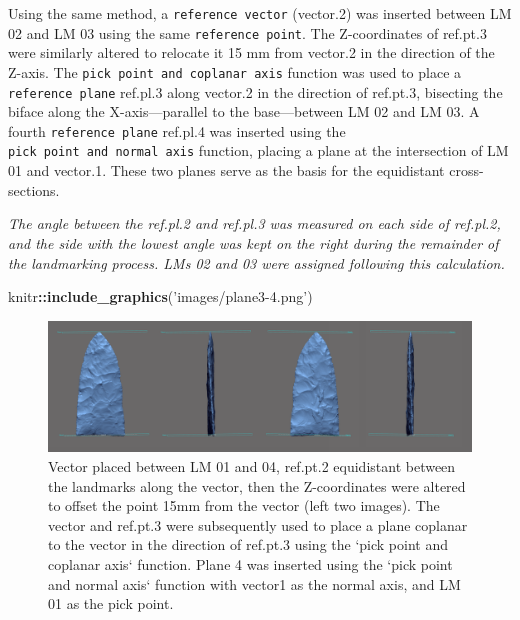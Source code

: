 \documentclass[
]{article}
\newenvironment{Shaded}{\begin{snugshade}}{\end{snugshade}}
\newcommand{\KeywordTok}[1]{\textcolor[rgb]{0.13,0.29,0.53}{\textbf{#1}}}
\newcommand{\NormalTok}[1]{#1}
\newcommand{\OperatorTok}[1]{\textcolor[rgb]{0.81,0.36,0.00}{\textbf{#1}}}
\newcommand{\StringTok}[1]{\textcolor[rgb]{0.31,0.60,0.02}{#1}}
\begin{document}
Using the same method, a \texttt{reference\ vector} (vector.2) was
inserted between LM 02 and LM 03 using the same
\texttt{reference\ point}. The Z-coordinates of ref.pt.3 were similarly
altered to relocate it 15 mm from vector.2 in the direction of the
Z-axis. The \texttt{pick\ point\ and\ coplanar\ axis} function was used
to place a \texttt{reference\ plane} ref.pl.3 along vector.2 in the
direction of ref.pt.3, bisecting the biface along the X-axis---parallel
to the base---between LM 02 and LM 03. A fourth
\texttt{reference\ plane} ref.pl.4 was inserted using the
\texttt{pick\ point\ and\ normal\ axis} function, placing a plane at the
intersection of LM 01 and vector.1. These two planes serve as the basis
for the equidistant cross-sections.

\emph{The angle between the ref.pl.2 and ref.pl.3 was measured on each
side of ref.pl.2, and the side with the lowest angle was kept on the
right during the remainder of the landmarking process. LMs 02 and 03
were assigned following this calculation.}

\begin{Shaded}
\begin{Highlighting}[]
\NormalTok{knitr}\OperatorTok{::}\KeywordTok{include_graphics}\NormalTok{(}\StringTok{'images/plane3-4.png'}\NormalTok{)}
\end{Highlighting}
\end{Shaded}

\begin{figure}
\includegraphics[width=1\linewidth]{images/plane3-4} \caption{Vector placed between LM 01 and 04, ref.pt.2 equidistant between the landmarks along the vector, then the Z-coordinates were altered to offset the point 15mm from the vector (left two images). The vector and ref.pt.3 were subsequently used to place a plane coplanar to the vector in the direction of ref.pt.3 using the `pick point and coplanar axis` function. Plane 4 was inserted using the `pick point and normal axis` function with vector1 as the normal axis, and LM 01 as the pick point.}\label{fig:plane3.4}
\end{figure}
\end{document}
